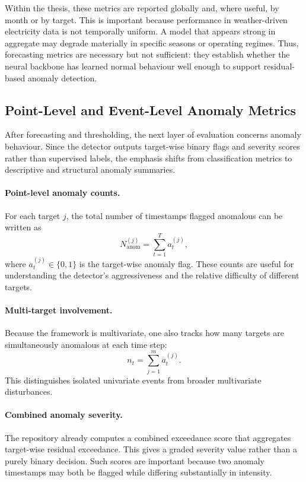 Within the thesis, these metrics are reported globally and, where useful, by month or by target. This is important because performance in weather-driven electricity data is not temporally uniform. A model that appears strong in aggregate may degrade materially in specific seasons or operating regimes. Thus, forecasting metrics are necessary but not sufficient: they establish whether the neural backbone has learned normal behaviour well enough to support residual-based anomaly detection.

\subsection{Point-Level and Event-Level Anomaly Metrics}

After forecasting and thresholding, the next layer of evaluation concerns anomaly behaviour. Since the detector outputs target-wise binary flags and severity scores rather than supervised labels, the emphasis shifts from classification metrics to descriptive and structural anomaly summaries.

\paragraph{Point-level anomaly counts.}
For each target $j$, the total number of timestamps flagged anomalous can be written as
\begin{equation}
	N^{(j)}_{\mathrm{anom}} =
	\sum_{t=1}^{T} a_t^{(j)},
	\label{eq:anom_count}
\end{equation}
where $a_t^{(j)} \in \{0,1\}$ is the target-wise anomaly flag. These counts are useful for understanding the detector’s aggressiveness and the relative difficulty of different targets.

\paragraph{Multi-target involvement.}
Because the framework is multivariate, one also tracks how many targets are simultaneously anomalous at each time step:
\begin{equation}
	n_t =
	\sum_{j=1}^{m} a_t^{(j)}.
	\label{eq:multi_target_count}
\end{equation}
This distinguishes isolated univariate events from broader multivariate disturbances.

\paragraph{Combined anomaly severity.}
The repository already computes a combined exceedance score that aggregates target-wise residual exceedance. This gives a graded severity value rather than a purely binary decision. Such scores are important because two anomaly timestamps may both be flagged while differing substantially in intensity.

